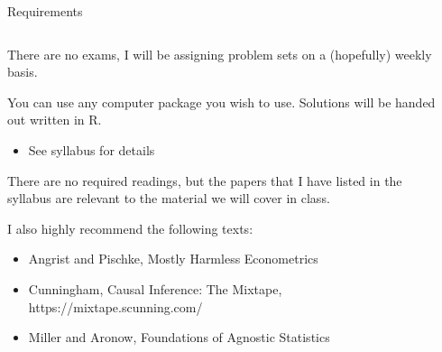 \documentclass[notes,11pt, aspectratio=169]{beamer}
\newenvironment{wideitemize}{\itemize\addtolength{\itemsep}{10pt}}{\enditemize}
\begin{document}
\begin{frame}{Requirements }
\begin{columns}[T] %
\begin{column}{.7\textwidth}
  \begin{wideitemize}
  \item There are no exams, I will be assigning problem sets on a (hopefully) weekly basis.
  \item You can use any computer package you wish to use. Solutions will be handed out written in R. 
    \begin{itemize}
    \item See syllabus for details
    \end{itemize}
  \item There are no required readings, but the papers that I have
    listed in the syllabus are relevant to the material we will cover
    in class.
  \item I also highly recommend the following texts:
    \begin{itemize}
    \item Angrist and  Pischke, Mostly Harmless Econometrics
    \item  Cunningham, Causal Inference: The Mixtape, https://mixtape.scunning.com/
    \item  Miller and Aronow, Foundations of Agnostic Statistics
    \end{itemize}
  \end{wideitemize}
\end{column}%
\hfill%
\begin{column}{.38\textwidth}
  \makebox[\linewidth][c]{
    \resizebox{\linewidth}{!}{
    }
  }
\end{column}%
\end{columns}
\end{frame}
\end{document}
